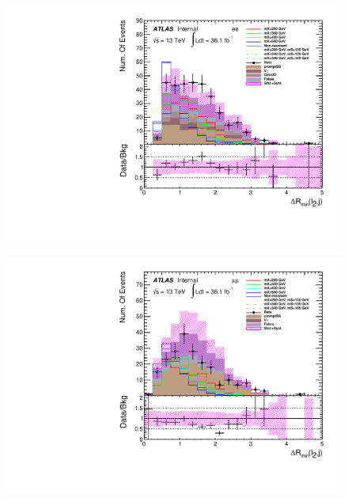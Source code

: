 \begin{figure}[h]
 \begin{minipage}[t]{0.33\linewidth}
 \centering
 \includegraphics[width=1.0\textwidth]{fig/dataMC_high_Njet_CR/mindR_l2j_ee.pdf}\label{fig:dataMC_high_Njet_CR:mindRl2j_ee.pdf}
 \end{minipage}
 \begin{minipage}[t]{0.33\linewidth}
 \centering
 \includegraphics[width=1.0\textwidth]{fig/dataMC_high_Njet_CR/mindR_l2j_mumu.pdf}\label{fig:dataMC_high_Njet_CR:mindRl2j_mumu.pdf}
 \end{minipage}
 \begin{minipage}[t]{0.33\linewidth}
 \centering

\end{minipage}
\end{figure}

